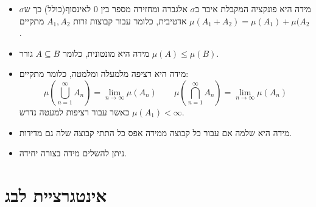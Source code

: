 \documentclass{tstextbook}
\begin{document}
\begin{summary}
  \begin{itemize}
    \item מידה היא פונקציה המקבלת איבר ב\(\sigma\) אלגברה ומחזירה מספר בין 0 לאינסוף(כולל) כך ש\(\sigma\) אדטיבית, כלומר עבור קבוצות זרות \(A_{1},A_{2}\) מתקיים \(\mu(A_{1}+A_{2})=\mu(A_{1})+\mu(A_{2}\).
    \item מידה היא מונטונית, כלומר \(A\subseteq B\) גורר \(\mu(A)\leq \mu(B)\).
    \item מידה היא רציפה מלמעלה ומלמטה, כלומר מתקיים:
$$\mu\left( \bigcup_{n=1}^{\infty}A_{n} \right)=\lim_{ n \to \infty } \mu(A_{n})\qquad \mu\left( \bigcap_{n=1}^{\infty}A_{n} \right)=\lim_{ n \to \infty } \mu(A_{n})$$
כאשר עבור רציפות למעטה נדרש \(\mu(A_{1})< \infty\).
    \item מידה היא שלמה אם עבור כל קבוצה ממידה אפס כל התתי קבוצה שלה גם מדידות.
    \item ניתן להשלים מידה בצורה יחידה.
  \end{itemize}
\end{summary}

\section{אינטגרציית לבג}
\end{document}
